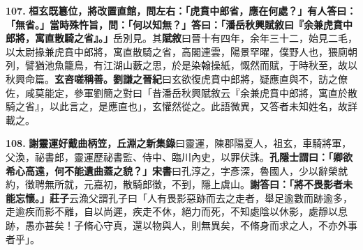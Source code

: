 \textbf{107.} \textbf{桓玄既簒位，將改置直館，問左右：「虎賁中郎省，應在何處？」有人答曰：「無省。」當時殊忤旨，問：「何以知無？」答曰：「潘岳秋興賦敘曰『余兼虎賁中郎將，寓直散騎之省』。」}{\footnotesize 岳別見。其\textbf{賦敘}曰晉十有四年，余年三十二，始見二毛，以太尉掾兼虎賁中郎將，寓直散騎之省，高閣連雲，陽景罕曜，僕野人也，猥廁朝列，譬猶池魚籠鳥，有江湖山藪之思，於是染翰操紙，慨然而賦，于時秋至，故以秋興命篇。}\textbf{玄咨嗟稱善。}{\footnotesize \textbf{劉謙之晉紀}曰玄欲復虎賁中郎將，疑應直與不，訪之僚佐，咸莫能定，參軍劉簡之對曰「昔潘岳秋興賦敘云『余兼虎賁中郎將，寓直於散騎之省』，以此言之，是應直也」，玄懽然從之。此語微異，又答者未知姓名，故詳載之。}

\textbf{108.} \textbf{謝靈運好戴曲柄笠，}{\footnotesize \textbf{丘淵之新集錄}曰靈運，陳郡陽夏人，祖玄，車騎將軍，父渙，祕書郎，靈運歷祕書監、侍中、臨川內史，以罪伏誅。}\textbf{孔隱士謂曰：「卿欲希心高遠，何不能遺曲蓋之貌？」}{\footnotesize \textbf{宋書}曰孔淳之，字彥深，魯國人，少以辭榮就約，徵聘無所就，元嘉初，散騎郎徵，不到，隱上虞山。}\textbf{謝答曰：「將不畏影者未能忘懷。」}{\footnotesize \textbf{莊子}云漁父謂孔子曰「人有畏影惡跡而去之走者，舉足逾數而跡逾多，走逾疾而影不離，自以尚遲，疾走不休，絕力而死，不知處陰以休影，處靜以息跡，愚亦甚矣！子脩心守真，還以物與人，則無異矣，不脩身而求之人，不亦外事者乎」。}
